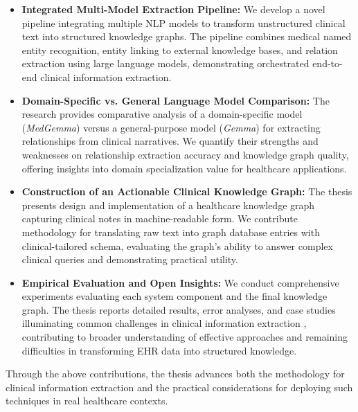 \begin{itemize}
  \item \textbf{Integrated Multi-Model Extraction Pipeline:} We develop a novel pipeline integrating multiple NLP models to transform unstructured clinical text into structured knowledge graphs. The pipeline combines medical named entity recognition, entity linking to external knowledge bases, and relation extraction using large language models, demonstrating orchestrated end-to-end clinical information extraction.

  \item \textbf{Domain-Specific vs. General Language Model Comparison:} The research provides comparative analysis of a domain-specific model (\emph{MedGemma}) versus a general-purpose model (\emph{Gemma}) for extracting relationships from clinical narratives. We quantify their strengths and weaknesses on relationship extraction accuracy and knowledge graph quality, offering insights into domain specialization value for healthcare applications.

  \item \textbf{Construction of an Actionable Clinical Knowledge Graph:} The thesis presents design and implementation of a healthcare knowledge graph capturing clinical notes in machine-readable form. We contribute methodology for translating raw text into graph database entries with clinical-tailored schema, evaluating the graph's ability to answer complex clinical queries and demonstrating practical utility.

  \item \textbf{Empirical Evaluation and Open Insights:} We conduct comprehensive experiments evaluating each system component and the final knowledge graph. The thesis reports detailed results, error analyses, and case studies illuminating common challenges in clinical information extraction \parencite{Hier2025}, contributing to broader understanding of effective approaches and remaining difficulties in transforming EHR data into structured knowledge.
\end{itemize}

Through the above contributions, the thesis advances both the methodology for clinical information extraction and the practical considerations for deploying such techniques in real healthcare contexts.